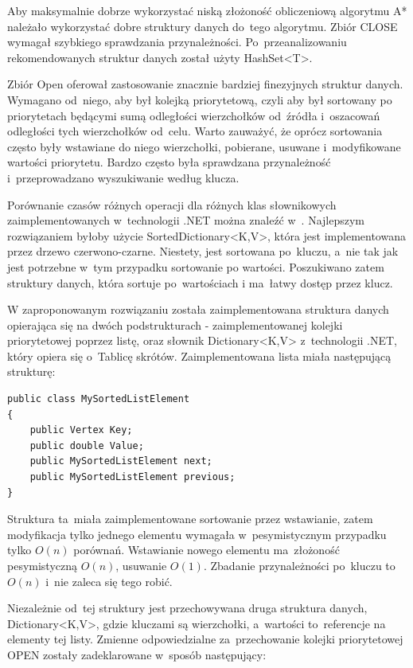 \documentclass[a4paper,11pt,twoside,openright]{report}
\theoremstyle{definition}
\begin{document}
Aby maksymalnie dobrze wykorzystać niską złożoność obliczeniową algorytmu A*
należało wykorzystać dobre struktury danych do~tego algorytmu. Zbiór CLOSE
wymagał szybkiego sprawdzania przynależności. Po~przeanalizowaniu rekomendowanych
struktur danych \cite{Dotnet struktury} został użyty HashSet<T>.

Zbiór Open oferował zastosowanie znacznie bardziej finezyjnych struktur danych.
Wymagano od~niego, aby był kolejką priorytetową, czyli aby był sortowany po
priorytetach będącymi sumą odległości wierzchołków od~źródła i~oszacowań odległości
tych wierzchołków od~celu. Warto zauważyć, że oprócz sortowania często były wstawiane
do niego wierzchołki, pobierane, usuwane i~modyfikowane wartości priorytetu.
Bardzo często była sprawdzana przynależność i~przeprowadzano 
wyszukiwanie według klucza.

Porównanie czasów różnych operacji dla różnych klas słownikowych zaimplementowanych
w~technologii .NET można znaleźć w~\cite{C w pigulce}.
Najlepszym rozwiązaniem byłoby użycie SortedDictionary<K,V>,
która jest implementowana przez drzewo czerwono-czarne. Niestety, jest
sortowana po~kluczu, a~nie tak jak jest potrzebne w~tym przypadku sortowanie
po wartości. Poszukiwano zatem struktury danych, która sortuje po~wartościach
i ma~łatwy dostęp przez klucz.

W zaproponowanym rozwiązaniu została zaimplementowana struktura danych opierająca się
na dwóch podstrukturach - zaimplementowanej kolejki priorytetowej poprzez listę,
oraz słownik Dictionary<K,V> z~technologii .NET, który opiera się o~Tablicę
skrótów. Zaimplementowana lista miała następującą strukturę:

\begin{verbatim}
public class MySortedListElement
{
    public Vertex Key;
    public double Value;
    public MySortedListElement next;
    public MySortedListElement previous;
}
\end{verbatim}

Struktura ta~miała zaimplementowane sortowanie przez wstawianie, zatem modyfikacja
tylko jednego elementu wymagała w~pesymistycznym przypadku tylko $O(n)$ porównań.
Wstawianie nowego elementu ma~złożoność pesymistyczną $O(n)$, usuwanie $O(1)$.
Zbadanie przynależności po~kluczu to~$O(n)$ i~nie zaleca się tego robić.

Niezależnie od~tej struktury jest przechowywana druga struktura danych,
Dictionary<K,V>, gdzie kluczami są wierzchołki, a~wartości to~referencje na
elementy tej listy. Zmienne odpowiedzialne za~przechowanie kolejki priorytetowej
OPEN zostały zadeklarowane w~sposób następujący:
\end{document}
